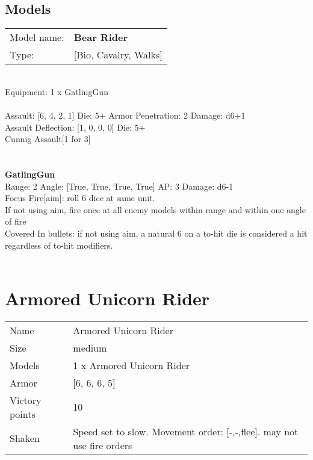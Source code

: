 \pagebreak

\subsection{ Models }

\begin{tabular}{ll}
Model name: & {\bf Bear Rider } \\
Type: & [Bio, Cavalry, Walks] \\
\end{tabular}
\ \\
Equipment: 1 x GatlingGun \\
\ \\
Assault: [6, 4, 2, 1] Die: 5+ Armor Penetration: 2 Damage: d6+1 \\
Assault Deflection: [1, 0, 0, 0] Die: 5+\\
\indent Cunnig Assault[1 for 3]\\ 
 
\ \\

\ \\
{\bf GatlingGun } \\



Range: 2  Angle: [True, True, True, True] AP: 3 Damage: d6-1 \\
Focus Fire[aim]: roll 6 dice at same unit.\\ 
If not using aim, fire once at all enemy models within range and within one angle of fire\\ 
Covered In bullets: if not using aim, a natural 6 on a to-hit die is considered a hit regardless of to-hit modifiers.\\ 




 
\ \\














\pagebreak\clearpage

\section{ Armored Unicorn Rider }

\begin{tabular}{ll}
  Name & Armored Unicorn Rider \\
  Size & medium\\
  Models & 1 x Armored Unicorn Rider\\
  Armor & [6, 6, 6, 5]\\
  Victory points & 10\\
  Shaken & Speed set to slow. Movement order: [-,-,flee]. may not use fire orders\\
\end{tabular}

